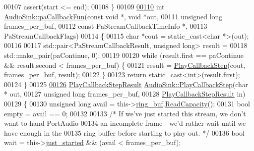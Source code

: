 \begin{DoxyCode}
00107     assert(start <= end);
00108 \}
00109 
\hypertarget{audio__sink_8cpp_source_l00110}{}\hyperlink{classAudioSink_ad3534ea4210aa83b42706c0361fd3e8d}{00110} \textcolor{keywordtype}{int} \hyperlink{classAudioSink_ad3534ea4210aa83b42706c0361fd3e8d}{AudioSink::paCallbackFun}(\textcolor{keyword}{const} \textcolor{keywordtype}{void} *, \textcolor{keywordtype}{void} *out,
00111                              \textcolor{keywordtype}{unsigned} \textcolor{keywordtype}{long} frames\_per\_buf,
00112                              \textcolor{keyword}{const} PaStreamCallbackTimeInfo *,
00113                              PaStreamCallbackFlags)
00114 \{
00115     \textcolor{keywordtype}{char} *cout = \textcolor{keyword}{static\_cast<}\textcolor{keywordtype}{char} *\textcolor{keyword}{>}(out);
00116 
00117     std::pair<PaStreamCallbackResult, unsigned long> result =
00118                     std::make\_pair(paContinue, 0);
00119 
00120     \textcolor{keywordflow}{while} (result.first == paContinue && result.second < frames\_per\_buf) \{
00121         result = \hyperlink{classAudioSink_a450ad1c0c64ddcc9b9a40d325983cbd9}{PlayCallbackStep}(cout, frames\_per\_buf, result);
00122     \}
00123     \textcolor{keywordflow}{return} \textcolor{keyword}{static\_cast<}\textcolor{keywordtype}{int}\textcolor{keyword}{>}(result.first);
00124 \}
00125 
\hypertarget{audio__sink_8cpp_source_l00126}{}\hyperlink{classAudioSink_a450ad1c0c64ddcc9b9a40d325983cbd9}{00126} \hyperlink{classAudioSink_a73002cc57611ac384c4e9d419e706e50}{PlayCallbackStepResult} \hyperlink{classAudioSink_a450ad1c0c64ddcc9b9a40d325983cbd9}{AudioSink::PlayCallbackStep}(\textcolor{keywordtype}{char} *
      out,
00127                                                    \textcolor{keywordtype}{unsigned} \textcolor{keywordtype}{long} frames\_per\_buf,
00128                                                    \hyperlink{classAudioSink_a73002cc57611ac384c4e9d419e706e50}{PlayCallbackStepResult} in)
00129 \{
00130     \textcolor{keywordtype}{unsigned} \textcolor{keywordtype}{long} avail = this->\hyperlink{classAudioSink_a87184f85d6cfcc7310043b877caeaee2}{ring\_buf}.\hyperlink{classRingBuffer_a7086cc66306105db205842af7a88c2d8}{ReadCapacity}();
00131     \textcolor{keywordtype}{bool} empty = avail == 0;
00132 
00133     \textcolor{comment}{/* If we've just started this stream, we don't want to hand PortAudio}
00134 \textcolor{comment}{       an incomplete frame—we'd rather wait until we have enough in the}
00135 \textcolor{comment}{       ring buffer before starting to play out. */}
00136     \textcolor{keywordtype}{bool} wait = this->\hyperlink{classAudioSink_a00cbaaf2b4fcf5d9acb614b909234196}{just\_started} && (avail < frames\_per\_buf);

\end{DoxyCode}
